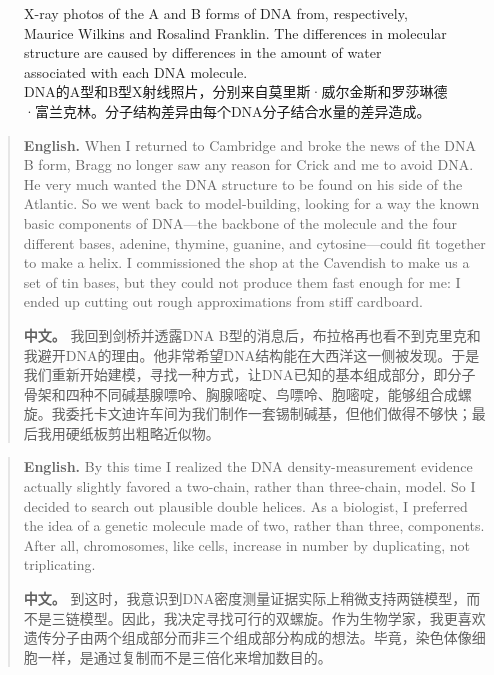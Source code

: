 \begin{figure}[htbp]
\centering
{}
\hfill
{}
\caption{X-ray photos of the A and B forms of DNA from, respectively, Maurice Wilkins and Rosalind Franklin. The differences in molecular structure are caused by differences in the amount of water associated with each DNA molecule.\\DNA的A型和B型X射线照片，分别来自莫里斯·威尔金斯和罗莎琳德·富兰克林。分子结构差异由每个DNA分子结合水量的差异造成。}
\end{figure}

\begin{quote}
\noindent\textbf{English.} When I returned to Cambridge and broke the news of the DNA B form, Bragg no longer saw any reason for Crick and me to avoid DNA. He very much wanted the DNA structure to be found on his side of the Atlantic. So we went back to model-building, looking for a way the known basic components of DNA---the backbone of the molecule and the four different bases, adenine, thymine, guanine, and cytosine---could fit together to make a helix. I commissioned the shop at the Cavendish to make us a set of tin bases, but they could not produce them fast enough for me: I ended up cutting out rough approximations from stiff cardboard.

\smallskip
\noindent\textbf{中文。} 我回到剑桥并透露DNA B型的消息后，布拉格再也看不到克里克和我避开DNA的理由。他非常希望DNA结构能在大西洋这一侧被发现。于是我们重新开始建模，寻找一种方式，让DNA已知的基本组成部分，即分子骨架和四种不同碱基腺嘌呤、胸腺嘧啶、鸟嘌呤、胞嘧啶，能够组合成螺旋。我委托卡文迪许车间为我们制作一套锡制碱基，但他们做得不够快；最后我用硬纸板剪出粗略近似物。
\end{quote}

\begin{quote}
\noindent\textbf{English.} By this time I realized the DNA density-measurement evidence actually slightly favored a two-chain, rather than three-chain, model. So I decided to search out plausible double helices. As a biologist, I preferred the idea of a genetic molecule made of two, rather than three, components. After all, chromosomes, like cells, increase in number by duplicating, not triplicating.

\smallskip
\noindent\textbf{中文。} 到这时，我意识到DNA密度测量证据实际上稍微支持两链模型，而不是三链模型。因此，我决定寻找可行的双螺旋。作为生物学家，我更喜欢遗传分子由两个组成部分而非三个组成部分构成的想法。毕竟，染色体像细胞一样，是通过复制而不是三倍化来增加数目的。
\end{quote}

